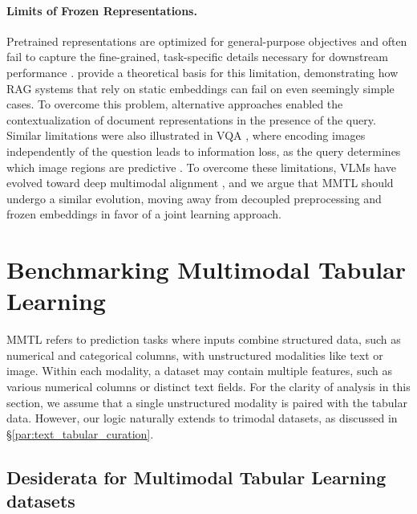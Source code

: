 \documentclass{llmxive}
\begin{document}
\paragraph{Limits of Frozen Representations.} 
Pretrained representations are optimized for general-purpose objectives and often fail to capture the fine-grained, task-specific details necessary for downstream performance \cite{tong_eyes_2024, liu_data_2025, gisserot-boukhlef_should_2025, cao_tipsv2_2026}. \citet{weller_theoretical_2025} provide a theoretical basis for this limitation, demonstrating how RAG systems \cite{lewis_retrieval-augmented_nodate} that rely on static embeddings can fail on even seemingly simple cases. To overcome this problem, alternative approaches \cite{khattab_colbert_2020, malaviya_quest_2023, fan_survey_2024, tang_we_2024, edge_local_2025, wang_jina-reranker-v3_2025, pu_customized_2025, koshorek_structured_2025, hoffer2026retrievalwithinintrinsiccapability} enabled the contextualization of document representations in the presence of the query. Similar limitations were also illustrated in VQA \cite{antol_vqa_2015}, where encoding images independently of the question leads to information loss, as the query determines which image regions are predictive \cite{ganz_question_2024, li_lost_2025}. To overcome these limitations, VLMs have evolved toward deep multimodal alignment \cite{radford_learning_2021, alayrac_flamingo_2022, liu_visual_2023}, and we argue that MMTL should undergo a similar evolution, moving away from decoupled preprocessing and frozen embeddings in favor of a joint learning approach.

\section{Benchmarking Multimodal Tabular Learning}\label{sec:benchmarking}

MMTL \cite{jiang_representation_2026, kim_multimodalpfn_2025} refers to prediction tasks where inputs combine structured data, such as numerical and categorical columns, with unstructured modalities like text or image. Within each modality, a dataset may contain multiple features, such as various numerical columns or distinct text fields. For the clarity of analysis in this section, we assume that a single unstructured modality is paired with the tabular data. However, our logic naturally extends to trimodal datasets, as discussed in \S\ref{par:text_tabular_curation}.


\subsection{Desiderata for Multimodal Tabular Learning datasets}
\label{sec:benchmark_desiderata}
\end{document}

